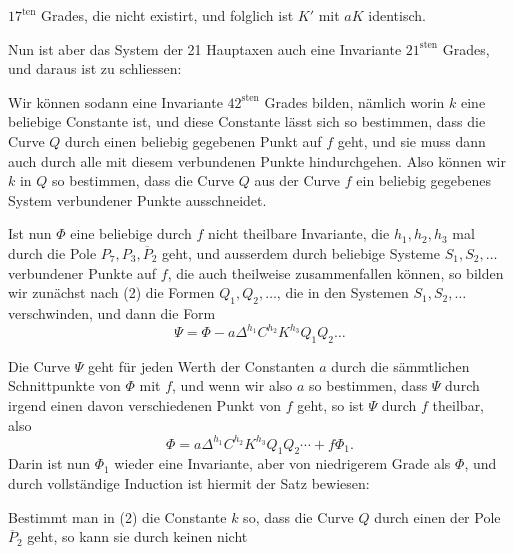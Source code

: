 $17^{\text{ten}}$ Grades, die nicht existirt, und folglich ist $K'$ mit
$aK$ identisch.

\begin{center}
\end{center}

Nun ist aber das System der 21 Hauptaxen auch eine Invariante
$21^{\text{sten}}$ Grades, und daraus ist zu schliessen:

\begin{center}
\end{center}

Wir können sodann eine Invariante $42^{\text{sten}}$ Grades bilden,
nämlich
worin $k$ eine beliebige Constante ist, und diese Constante lässt
sich so bestimmen, dass die Curve $Q$ durch einen beliebig gegebenen
Punkt auf $f$ geht, und sie muss dann auch durch alle mit diesem
verbundenen Punkte hindurchgehen. Also können wir $k$ in $Q$ so
bestimmen, dass die Curve $Q$ aus der Curve $f$ ein beliebig
gegebenes System verbundener Punkte ausschneidet.

Ist nun $\Phi$ eine beliebige durch $f$ nicht theilbare Invariante,
die $h_1, h_2, h_3$ mal durch die Pole $P_7, P_3, \overline{P}_2$
geht, und ausserdem durch beliebige Systeme $S_1, S_2, \ldots$
verbundener Punkte auf $f$, die auch theilweise zusammenfallen
können, so bilden wir zunächst nach (2) die Formen
$Q_1, Q_2, \ldots$, die in den Systemen $S_1, S_2, \ldots$
verschwinden, und dann die Form
\[
\Psi = \Phi - a\Delta^{h_1} C^{h_2} K^{h_3} Q_1 Q_2 \ldots
\]

Die Curve $\Psi$ geht für jeden Werth der Constanten $a$ durch die
sämmtlichen Schnittpunkte von $\Phi$ mit $f$, und wenn wir also $a$ so
bestimmen, dass $\Psi$ durch irgend einen davon verschiedenen Punkt
von $f$ geht, so ist $\Psi$ durch $f$ theilbar, also
\[
\Phi = a\Delta^{h_1} C^{h_2} K^{h_3} Q_1 Q_2 \cdots + f\Phi_1.
\]
Darin ist nun $\Phi_1$ wieder eine Invariante, aber von niedrigerem
Grade als $\Phi$, und durch vollständige Induction ist hiermit der
Satz bewiesen:

\begin{center}
\end{center}

Bestimmt man in (2) die Constante $k$ so, dass die Curve $Q$ durch
einen der Pole $\overline{P}_2$ geht, so kann sie durch keinen nicht
